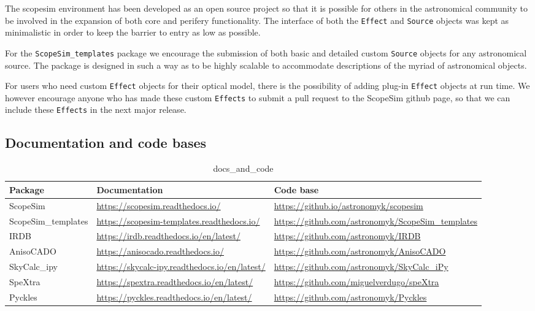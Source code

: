 The scopesim environment has been developed as an open source project so that it is possible for others in the astronomical community to be involved in the expansion of both core and perifery functionality.
The interface of both the \texttt{Effect} and \texttt{Source} objects was kept as minimalistic in order to keep the barrier to entry as low as possible.

For the \texttt{ScopeSim\_templates} package we encourage the submission of both basic and detailed custom \texttt{Source} objects for any astronomical source.
The package is designed in such a way as to be highly scalable to accommodate descriptions of the myriad of astronomical objects.

For users who need custom \texttt{Effect} objects for their optical model, there is the possibility of adding \textquotedbl{}plug-in\textquotedbl{} \texttt{Effect} objects at run time.
We however encourage anyone who has made these custom \texttt{Effects} to submit a pull request to the ScopeSim github page, so that we can include these \texttt{Effects} in the next major release.


\subsection{Documentation and code bases%
  \label{documentation-and-code-bases}%
}

\setlength{\DUtablewidth}{\linewidth}
\begin{longtable}[c]{|p{0.315\DUtablewidth}|p{0.315\DUtablewidth}|p{0.315\DUtablewidth}|}
\caption{docs\_and\_code}\\
\hline

Package
 & 
Documentation
 & 
Code base
 \\
\hline

ScopeSim
 & 
\url{https://scopesim.readthedocs.io/}
 & 
\url{https://github.io/astronomyk/scopesim}
 \\
\hline

ScopeSim\_templates
 & 
\url{https://scopesim-templates.readthedocs.io/}
 & 
\url{https://github.com/astronomyk/ScopeSim_templates}
 \\
\hline

IRDB
 & 
\url{https://irdb.readthedocs.io/en/latest/}
 & 
\url{https://github.com/astronomyk/IRDB}
 \\
\hline

AnisoCADO
 & 
\url{https://anisocado.readthedocs.io/}
 & 
\url{https://github.com/astronomyk/AnisoCADO}
 \\
\hline

SkyCalc\_ipy
 & 
\url{https://skycalc-ipy.readthedocs.io/en/latest/}
 & 
\url{https://github.com/astronomyk/SkyCalc_iPy}
 \\
\hline

SpeXtra
 & 
\url{https://spextra.readthedocs.io/en/latest/}
 & 
\url{https://github.com/miguelverdugo/speXtra}
 \\
\hline

Pyckles
 & 
\url{https://pyckles.readthedocs.io/en/latest/}
 & 
\url{https://github.com/astronomyk/Pyckles}
 \\
\hline
\end{longtable}
\label{tbl-list-of-packages}
